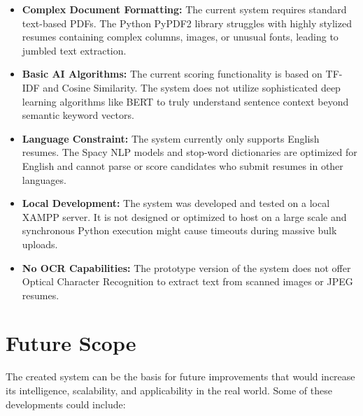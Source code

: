 \documentclass[12pt,a4paper]{report}
\begin{document}
\begin{itemize}
    \item \textbf{Complex Document Formatting:} The current system requires standard text-based PDFs. The Python PyPDF2 library struggles with highly stylized resumes containing complex columns, images, or unusual fonts, leading to jumbled text extraction.

\item \textbf{Basic AI Algorithms:} The current scoring
functionality is based on TF-IDF and Cosine Similarity. The
system does not utilize sophisticated deep learning algorithms
like BERT to truly understand sentence context beyond semantic keyword vectors.

\item \textbf{Language Constraint:} The system currently only supports English resumes. The Spacy NLP models and stop-word dictionaries are optimized for English and cannot parse or score candidates who submit resumes in other languages.

\item \textbf{Local Development:} The system was developed and tested on a local XAMPP server. It is not designed or optimized to host on a large scale and synchronous Python execution might cause timeouts during massive bulk uploads.

\item \textbf{No OCR Capabilities:} The prototype version of
the system does not offer Optical Character Recognition to extract text from scanned images or JPEG resumes.
\end{itemize}


\section{Future Scope}

The created system can be the basis for future improvements that would
increase its intelligence, scalability, and applicability in the real world.
Some of these developments could include:
\end{document}
